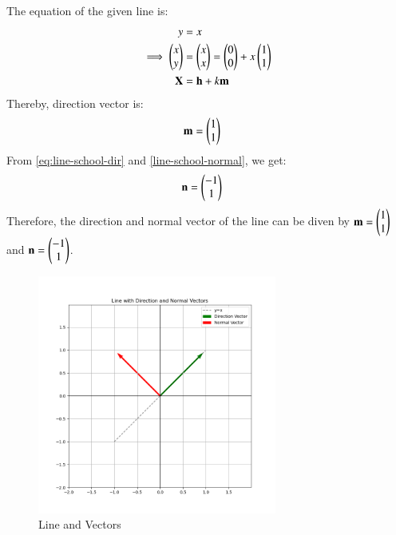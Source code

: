\documentclass[journal]{IEEEtran}
\begin{document}
The equation of the given line is:
\begin{align}
	y&=x\\
	\implies \begin{pmatrix}x \\ y\end{pmatrix} &= \begin{pmatrix}x\\ x\end{pmatrix} = \begin{pmatrix}0\\0\end{pmatrix} + x\begin{pmatrix}1\\1\end{pmatrix}\\
	\mathbf{X}&=\mathbf{h} + k\mathbf{m}
\end{align}
Thereby, direction vector is:
\begin{align}
	\mathbf{m} &= \begin{pmatrix}1\\1\end{pmatrix}
\end{align}
From \eqref{eq:line-school-dir} and \eqref{line-school-normal}, we get:
\begin{align}
	\mathbf{n}&=\begin{pmatrix}-1\\1\end{pmatrix}
\end{align}
Therefore, the direction and normal vector of the line can be diven by $\mathbf{m} =\begin{pmatrix}1\\1\end{pmatrix}$ and $\mathbf{n} = \begin{pmatrix}-1\\1\end{pmatrix}$.
\newpage
\begin{figure}[h!]
\begin{center}
	\includegraphics[width=0.7\textwidth]{Fig/fig.png}
	\caption{Line and Vectors}
	\label{fig:4-4.2-13 - Figure -1}
\end{center}
\end{figure}
\end{document}
